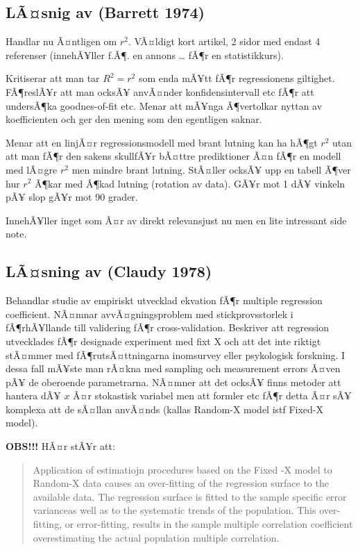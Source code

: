 \documentclass[]{article}
\begin{document}
\subsection{LÃ¤snig av (Barrett 1974)}\label{lasnig-av-barrett1974}

Handlar nu Ã¤ntligen om \(r^2\). VÃ¤ldigt kort artikel, 2 sidor med
endast 4 referenser (innehÃ¥ller f.Ã¶. en annons \ldots{} fÃ¶r en
statistikkurs).

Kritiserar att man tar \(R^2 = r^2\) som enda mÃ¥tt fÃ¶r regressionens
giltighet. FÃ¶reslÃ¥r att man ocksÃ¥ anvÃ¤nder konfidensintervall etc
fÃ¶r att undersÃ¶ka goodnes-of-fit etc. Menar att mÃ¥nga Ã¶vertolkar
nyttan av koefficienten och ger den mening som den egentligen saknar.

Menar att en linjÃ¤r regressionsmodell med brant lutning kan ha hÃ¶gt
\(r^2\) utan att man fÃ¶r den sakens skullfÃ¥r bÃ¤ttre prediktioner Ã¤n
fÃ¶r en modell med lÃ¤gre \(r^2\) men mindre brant lutning. StÃ¤ller
ocksÃ¥ upp en tabell Ã¶ver hur \(r^2\) Ã¶kar med Ã¶kad lutning (rotation
av data). GÃ¥r mot 1 dÃ¥ vinkeln pÃ¥ slop gÃ¥r mot 90 grader.

InnehÃ¥ller inget som Ã¤r av direkt relevansjust nu men en lite
intressant side note.

\subsection{LÃ¤sning av (Claudy 1978)}\label{lasning-av-claudy1978}

Behandlar studie av empiriskt utvecklad ekvation fÃ¶r multiple
regression coefficient. NÃ¤mnar avvÃ¤gningsproblem med stickprovsstorlek
i fÃ¶rhÃ¥llande till validering fÃ¶r cross-validation. Beskriver att
regression utvecklades fÃ¶r designade experiment med fixt X och att det
inte riktigt stÃ¤mmer med fÃ¶rutsÃ¤ttningarna inomsurvey eller
psykologisk forskning. I dessa fall mÃ¥ste man rÃ¤kna med sampling och
measurement errors Ã¤ven pÃ¥ de oberoende parametrarna. NÃ¤mner att det
ocksÃ¥ finns metoder att hantera dÃ¥ \(x\) Ã¤r stokastisk variabel men
att formler etc fÃ¶r detta Ã¤r sÃ¥ komplexa att de sÃ¤llan anvÃ¤nds
(kallas Random-X model istf Fixed-X model).

\textbf{OBS!!!} HÃ¤r stÃ¥r att:

\begin{quote}
Application of estimatiojn procedures based on the Fixed -X model to
Random-X data causes an over-fitting of the regression surface to the
available data. The regression surface is fitted to the sample specific
error varianceas well as to the systematic trends of the population.
This over-fitting, or error-fitting, results in the sample multiple
correlation coefficient overestimating the actual population multiple
correlation.
\end{quote}
\end{document}
